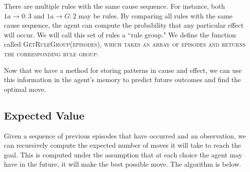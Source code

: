 \documentclass[letterpaper]{article} %
\begin{document}
There are multiple rules with the same cause sequence. For instance, both $1a \rightarrow 0: 3$ and $1a \rightarrow G: 2$ may be rules. By comparing all rules with the same cause sequence, the agent can compute the probability that any particular effect will occur. We will call this set of rules a ``rule group." We define the function called \scshape GetRuleGroup\normalfont(episodes), which takes an array of episodes and returns the corresponding rule group.


Now that we have a method for storing patterns in cause and effect, we can use this information in the agent's memory to predict future outcomes and find the optimal move.

\subsection{Expected Value}

Given a sequence of previous episodes that have occurred and an observation, we can recursively compute the expected number of moves it will take to reach the goal. This is computed under the assumption that at each choice the agent may have in the future, it will make the best possible move. The algorithm is below.

\end{document}
